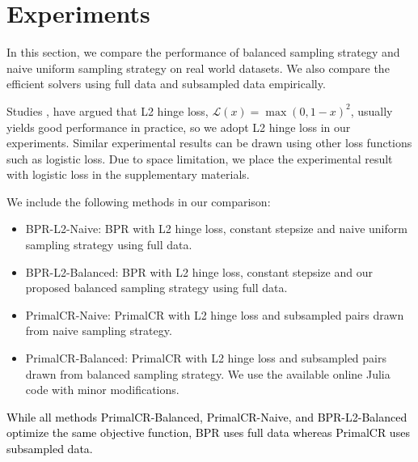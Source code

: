 \documentclass{article}
\numberwithin{equation}{section}
\newcommand{\laks}[1]{\textcolor{black}{#1}}
\newtheorem{sampling strategy}{Sampling Strategy}
\begin{document}
\section{Experiments}
\label{sec:exp}

In this section, we compare the performance of balanced sampling strategy and naive uniform sampling strategy on real world datasets. {\color We also compare the efficient solvers using full data and subsampled data empirically}.

Studies \cite{cr}, \cite{crlinear} have argued that L2 hinge loss, $\mathcal{L}(x) = \max(0, 1- x)^2$, usually yields good performance in practice, so we adopt L2 hinge loss in our experiments. Similar experimental results can be drawn using other loss functions such as logistic loss. Due to space limitation, we place the experimental result with logistic loss in the supplementary materials.

We include the following methods in our comparison:

\begin{itemize}
    \item \textsf{BPR-L2-Naive}: BPR with L2 hinge loss, constant stepsize and naive uniform sampling strategy using full data.
    \item \textsf{BPR-L2-Balanced}: BPR with L2 hinge loss, constant stepsize and our proposed balanced sampling strategy using full data.
    \item \textsf{PrimalCR-Naive}: PrimalCR with L2 hinge loss and subsampled pairs drawn from naive sampling strategy. 
    \item \textsf{PrimalCR-Balanced}: PrimalCR with L2 hinge loss and subsampled pairs drawn from balanced sampling strategy. We use the  available online Julia code with minor modifications. %
    
\end{itemize}
\laks{While all methods \textsf{PrimalCR-Balanced},  \textsf{PrimalCR-Naive}, and  \textsf{BPR-L2-Balanced}  optimize  the same objective function, \textsf{BPR} uses full data whereas \textsf{PrimalCR} uses subsampled data.} 

\end{document}
